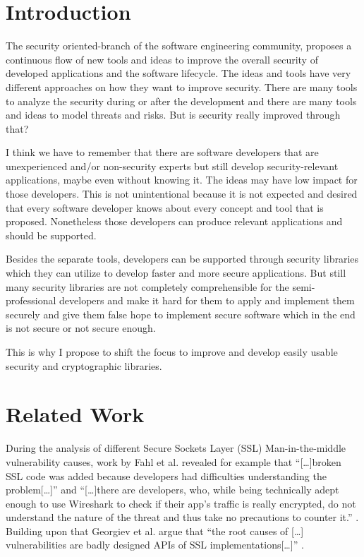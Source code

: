 \documentclass{sig-alternate-05-2015}
\begin{document}


\printccsdesc



\section{Introduction}
The security oriented-branch of the software engineering community, proposes a continuous flow of new tools and ideas to improve the overall security of developed applications and the software lifecycle. The ideas and tools have very different approaches on how they want to improve security. 
There are many tools to analyze the security during or after the development and there are many tools and ideas to model threats and risks. But is security really improved through that?

I think we have to remember that there are software developers that are unexperienced and/or non-security experts but still develop security-relevant applications, maybe even without knowing it. The ideas may have low impact for those developers. This is not unintentional because it is not expected and desired that every software developer knows about every concept and tool that is proposed. Nonetheless those developers can produce relevant applications and should be supported.

Besides the separate tools, developers can be supported through security libraries which they can utilize to develop faster and more secure applications. But still many security libraries are not completely comprehensible for the semi-professional developers and make it hard for them to apply and implement them securely \cite{Fahl:2013:RSD:2508859.2516655} and give them false hope to implement secure software which in the end is not secure or not secure enough.

This is why I propose to shift the focus to improve and develop easily usable security and cryptographic libraries.

\section{Related Work}
During the analysis of different Secure Sockets Layer (SSL) Man-in-the-middle vulnerability causes, work by Fahl et al. revealed for example that \enquote{[\dots]broken SSL code was added because developers had difficulties understanding the problem[\dots]} \cite{Fahl:2013:RSD:2508859.2516655} and \enquote{[\dots]there are developers, who, while being technically adept enough to use Wireshark to check if their app's traffic is really encrypted, do not understand the nature of the threat and thus take no precautions to counter it.} \cite{Fahl:2013:RSD:2508859.2516655}. 
Building upon that Georgiev et al. argue that \enquote{the root causes of [\dots] vulnerabilities are badly designed APIs of SSL implementations[\dots]} \cite{Georgiev:2012:MDC:2382196.2382204}.
\end{document}
